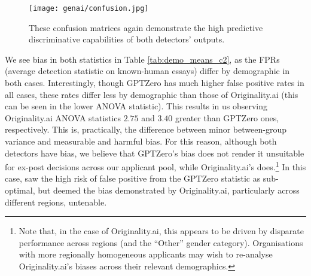 \begin{figure}[htb]
  \centering
  \texttt{[image: genai/confusion.jpg]}
  \caption{These confusion matrices again demonstrate the high predictive discriminative capabilities of both detectors' outputs.}
  \label{fig:confusion}
\end{figure}

We see bias in both statistics in Table \ref{tab:demo_means_c2}, as the FPRs (average detection statistic on known-human essays) differ by demographic in both cases. Interestingly, though GPTZero has much higher false positive rates in all cases, these rates differ less by demographic than those of Originality.ai (this can be seen in the lower ANOVA statistic). This results in us observing Originality.ai ANOVA statistics $2.75$ and $3.40$ greater than GPTZero ones, respectively. This is, practically, the difference between minor between-group variance and measurable and harmful bias. For this reason, although both detectors have bias, we believe that GPTZero's bias does not render it unsuitable for ex-post decisions across our applicant pool, while Originality.ai's does.\footnote{Note that, in the case of Originality.ai, this appears to be driven by disparate performance across regions (and the ``Other'' gender category). Organisations with more regionally homogeneous applicants may wish to re-analyse Originality.ai's biases across their relevant demographics.} In this case, \rise saw the high risk of false positive from the GPTZero statistic as sub-optimal, but deemed the bias demonstrated by Originality.ai, particularly across different regions, untenable.

